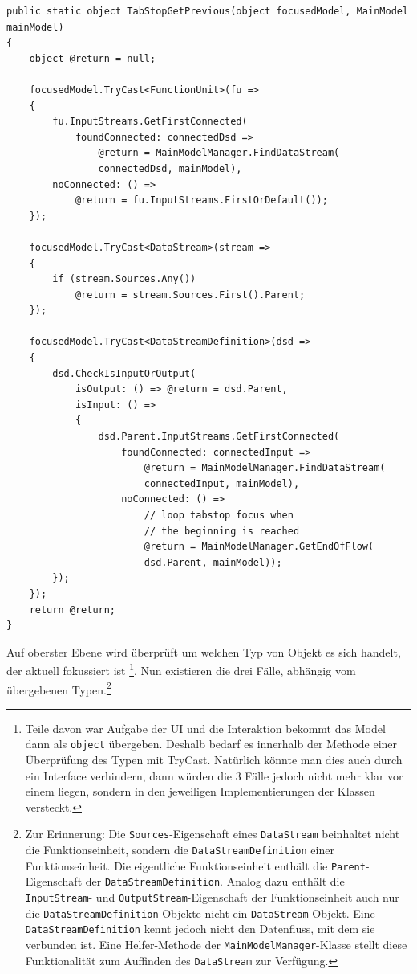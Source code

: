 \begin{enumerate}
	
\begin{lstlisting}[caption=Tabstop rückwärts]
public static object TabStopGetPrevious(object focusedModel, MainModel mainModel)
{
	object @return = null;
	
	focusedModel.TryCast<FunctionUnit>(fu => 
	{
		fu.InputStreams.GetFirstConnected(
			foundConnected: connectedDsd => 
				@return = MainModelManager.FindDataStream(
				connectedDsd, mainModel),
		noConnected: () =>
			@return = fu.InputStreams.FirstOrDefault());
	});
	
	focusedModel.TryCast<DataStream>(stream => 
	{
		if (stream.Sources.Any())
			@return = stream.Sources.First().Parent;
	});
	
	focusedModel.TryCast<DataStreamDefinition>(dsd => 
	{
		dsd.CheckIsInputOrOutput(
			isOutput: () => @return = dsd.Parent,
			isInput: () => 
			{
				dsd.Parent.InputStreams.GetFirstConnected(
					foundConnected: connectedInput =>
						@return = MainModelManager.FindDataStream(
						connectedInput, mainModel),
					noConnected: () =>
						// loop tabstop focus when
						// the beginning is reached
						@return = MainModelManager.GetEndOfFlow(
						dsd.Parent, mainModel));
		});
	});	
	return @return;
}
\end{lstlisting}
	
	

	Auf oberster Ebene wird überprüft um welchen Typ von Objekt es sich
	handelt, der aktuell fokussiert ist \footnote{Teile davon war Aufgabe der UI und die
	Interaktion bekommt das Model dann als \texttt{object} übergeben. Deshalb bedarf es
	innerhalb der Methode einer Überprüfung des Typen mit TryCast. Natürlich
  könnte man dies auch durch ein Interface verhindern, dann würden die 3 Fälle
  jedoch nicht mehr klar vor einem liegen, sondern in den jeweiligen
  Implementierungen der Klassen versteckt.}. Nun existieren die drei Fälle, abhängig vom übergebenen Typen.\footnote{Zur Erinnerung: Die \texttt{Sources}-Eigenschaft eines \texttt{DataStream} beinhaltet nicht die Funktionseinheit,
	sondern die \texttt{DataStreamDefinition} einer Funktionseinheit. Die eigentliche
	Funktionseinheit enthält die \texttt{Parent}-Eigenschaft der \texttt{DataStreamDefinition}.
	Analog dazu enthält die \texttt{InputStream}- und \texttt{OutputStream}-Eigenschaft der
	Funktionseinheit auch nur die \texttt{DataStreamDefinition}-Objekte nicht ein \texttt{DataStream}-Objekt.
	Eine \texttt{DataStreamDefinition} kennt jedoch nicht den Datenfluss, mit dem sie
	verbunden ist. Eine Helfer-Methode der \texttt{MainModelManager}-Klasse stellt
	diese Funktionalität zum Auffinden des \texttt{DataStream} zur Verfügung.}
\end{enumerate}

